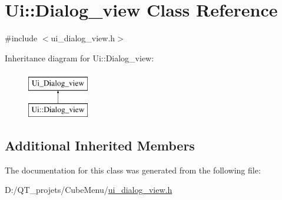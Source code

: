 \hypertarget{class_ui_1_1_dialog__view}{}\section{Ui\+:\+:Dialog\+\_\+view Class Reference}
\label{class_ui_1_1_dialog__view}


{\ttfamily \#include $<$ui\+\_\+dialog\+\_\+view.\+h$>$}

Inheritance diagram for Ui\+:\+:Dialog\+\_\+view\+:\begin{figure}[H]
\begin{center}
\leavevmode
\includegraphics[height=2.000000cm]{class_ui_1_1_dialog__view}
\end{center}
\end{figure}
\subsection*{Additional Inherited Members}


The documentation for this class was generated from the following file\+:\begin{DoxyCompactItemize}
\item 
D\+:/\+Q\+T\+\_\+projets/\+Cube\+Menu/\hyperlink{ui__dialog__view_8h}{ui\+\_\+dialog\+\_\+view.\+h}\end{DoxyCompactItemize}

